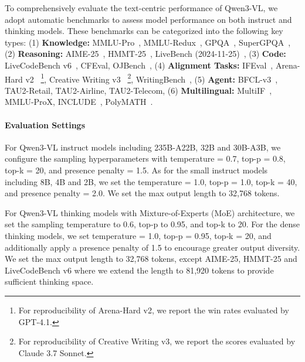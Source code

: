 To comprehensively evaluate the text-centric performance of Qwen3-VL, we adopt automatic benchmarks
to assess model performance on both instruct and thinking models. These benchmarks can be categorized into the following key types: (1) \textbf{Knowledge:} MMLU-Pro~\citep{mmlupro}, MMLU-Redux~\citep{DBLP:journals/corr/abs-2406-04127}, GPQA~\citep{DBLP:journals/corr/abs-2311-12022}, SuperGPQA~\citep{DBLP:journals/corr/abs-2502-14739}, (2) \textbf{Reasoning:} AIME-25~\citep{aime25}, HMMT-25~\citep{hmmt25}, LiveBench (2024-11-25)~\citep{DBLP:journals/corr/abs-2406-19314}, (3) \textbf{Code:} LiveCodeBench v6~\citep{DBLP:journals/corr/abs-2403-07974}, CFEval, OJBench~\citep{DBLP:journals/corr/abs-2506-16395}, (4) \textbf{Alignment Tasks:} IFEval~\citep{DBLP:journals/corr/abs-2311-07911}, Arena-Hard v2~\citep{DBLP:journals/corr/abs-2406-11939} \footnote{For reproducibility of Arena-Hard v2, we report the win rates evaluated by GPT-4.1.}, Creative Writing v3~\citep{DBLP:journals/corr/abs-2312-06281} \footnote{For reproducibility of Creative Writing v3, we report the scores evaluated by Claude 3.7 Sonnet.}, WritingBench~\citep{DBLP:journals/corr/abs-2503-05244}, (5) \textbf{Agent:} BFCL-v3~\citep{patil2025bfcl}, TAU2-Retail, TAU2-Airline, TAU2-Telecom, (6) \textbf{Multilingual:} MultiIF~\citep{DBLP:journals/corr/abs-2410-15553}, MMLU-ProX, INCLUDE~\citep{DBLP:conf/iclr/RomanouFSNSMACH25}, PolyMATH~\citep{DBLP:journals/corr/abs-2504-18428}.







\paragraph{Evaluation Settings} For Qwen3-VL instruct models including 235B-A22B, 32B and 30B-A3B, we configure the sampling hyperparameters with temperature = 0.7, top-p = 0.8, top-k = 20, and presence penalty = 1.5. As for the small instruct models including 8B, 4B and 2B, we set the temperature = 1.0, top-p = 1.0, top-k = 40, and presence penalty = 2.0. We set the max output length to 32,768 tokens.

For Qwen3-VL thinking models with Mixture-of-Experts (MoE) architecture, we set the sampling temperature to 0.6, top‑p to 0.95, and top‑k to 20. For the dense thinking models, we set temperature = 1.0, top‑p = 0.95, top‑k = 20, and additionally apply a presence penalty of 1.5 to encourage greater output diversity. We set the max output length to 32,768 tokens, except AIME-25, HMMT-25 and LiveCodeBench v6 where we extend the length to 81,920 tokens to provide sufficient thinking space.


